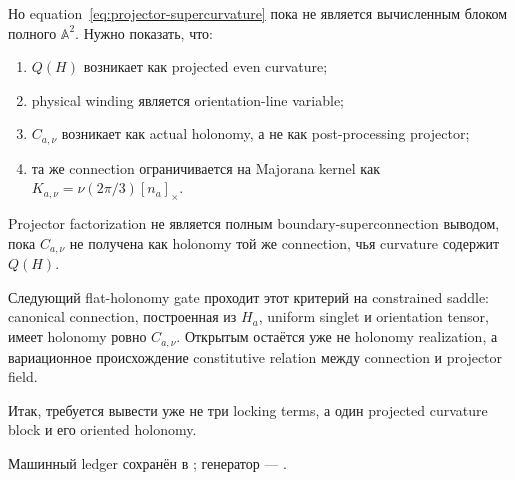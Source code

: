 Но equation~\eqref{eq:projector-supercurvature} пока не является
вычисленным блоком полного \(\mathbb A^2\). Нужно показать, что:
\begin{enumerate}
 \item \(Q(H)\) возникает как projected even curvature;
 \item physical winding является orientation-line variable;
 \item \(C_{a,\nu}\) возникает как actual holonomy, а не как
 post-processing projector;
 \item та же connection ограничивается на Majorana kernel как
 \(K_{a,\nu}=\nu(2\pi/3)[n_a]_\times\).
\end{enumerate}

\begin{nogocriterion}
Projector factorization не является полным boundary-superconnection
выводом, пока \(C_{a,\nu}\) не получена как holonomy той же connection,
чья curvature содержит \(Q(H)\).
\end{nogocriterion}

Следующий flat-holonomy gate проходит этот критерий на constrained saddle:
canonical connection, построенная из \(H_a\), uniform singlet и
orientation tensor, имеет holonomy ровно \(C_{a,\nu}\). Открытым остаётся
уже не holonomy realization, а вариационное происхождение constitutive
relation между connection и projector field.

Итак, требуется вывести уже не три locking terms, а один projected
curvature block и его oriented holonomy.

Машинный ledger сохранён в
;
генератор ---
.